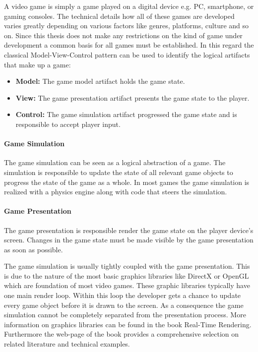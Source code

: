 A video game is simply a game played on a digital device e.g. PC, smartphone, or
gaming consoles. The technical details how all of these games are developed
varies greatly depending on various factors like genres, platforms, culture and
so on. Since this thesis does not make any restrictions on the kind of game
under development a common basis for all games must be established. In this
regard the classical Model-View-Control pattern can be used to identify the
logical artifacts that make up a game: 

\begin{itemize}
  \item \textbf{Model:} The game model artifact holds the game state.
  \item \textbf{View:} The game presentation artifact presents the game state to
  the player.
  \item \textbf{Control:} The game simulation artifact progressed the game
  state and is responsible to accept player input.
\end{itemize}

\paragraph{Game Simulation}

The game simulation can be seen as a logical abstraction of a game. The
simulation is responsible to update the state of all relevant game objects to
progress the state of the game as a whole. In most games the game simulation is
realized with a physics engine along with code that steers the simulation.

\paragraph{Game Presentation}

The game presentation is responsible render the game state on the player
device's screen. Changes in the game state must be made visible by the game
presentation as soon as possible.

The game simulation is usually tightly coupled with the game presentation. This
is due to the nature of the most basic graphics libraries like DirectX or OpenGL
which are foundation of most video games. These graphic libraries typically have
one main render loop. Within this loop the developer gets a chance to update
every game object before it is drawn to the screen. As a consequence the game
simulation cannot be completely separated from the presentation process. More
information on graphics libraries can be found in the book Real-Time
Rendering\cite{RTR3}. Furthermore the web-page of the book provides a
comprehensive selection on related literature and technical examples.

